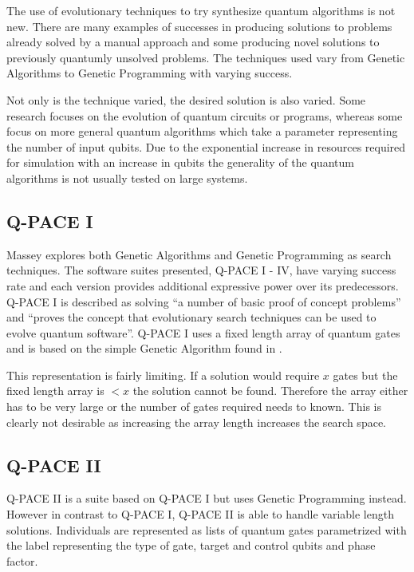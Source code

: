 The use of evolutionary techniques to try synthesize quantum algorithms is not new.
There are many examples of successes in producing solutions to problems already solved by a manual approach and some producing novel solutions to previously quantumly unsolved problems.
The techniques used vary from Genetic Algorithms to Genetic Programming with varying success.

Not only is the technique varied, the desired solution is also varied.
Some research focuses on the evolution of quantum circuits or programs, whereas some focus on more general quantum algorithms which take a parameter representing the number of input qubits.
Due to the exponential increase in resources required for simulation with an increase in qubits the generality of the quantum algorithms is not usually tested on large systems.

\subsection{Q-PACE I}
Massey\cite{masseythesis,masseymeng} explores both Genetic Algorithms and Genetic Programming as search techniques.
The software suites presented, Q-PACE I - IV, have varying success rate and each version provides additional expressive power over its predecessors.
Q-PACE I\cite{masseymeng} is described as solving ``a number of basic proof of concept problems''\cite{masseythesis} and ``proves the concept that evolutionary search techniques can be used to evolve quantum software''\cite{masseythesis}.
Q-PACE I uses a fixed length array of quantum gates and is based on the simple Genetic Algorithm found in \cite{1989goldberg}.

This representation is fairly limiting.
If a solution would require $x$ gates but the fixed length array is $<x$ the solution cannot be found.
Therefore the array either has to be very large or the number of gates required needs to known.
This is clearly not desirable as increasing the array length increases the search space.

\subsection{Q-PACE II}
Q-PACE II\cite{masseythesis} is a suite based on Q-PACE I but uses Genetic Programming instead.
However in contrast to Q-PACE I, Q-PACE II is able to handle variable length solutions. 
Individuals are represented as lists of quantum gates parametrized with the label representing the type of gate, target and control qubits and phase factor.

